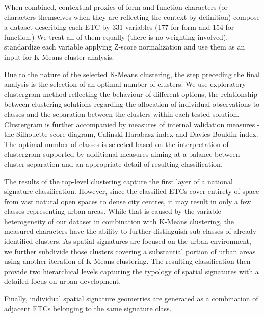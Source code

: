 

When combined, contextual proxies of form and function characters (or characters
themselves when they are reflecting the context by definition) compose a dataset
describing each ETC by 331 variables (177 for form and 154 for function.) We treat all
of them equally (there is no weighting involved), standardize each variable applying
Z-score normalization and use them as an input for K-Means cluster analysis.

Due to the nature of the selected K-Means clustering, the step preceding the final
analysis is the selection of an optimal number of clusters. We use exploratory
clustergram method\cite{schonlau2002clustergram} reflecting the behaviour of different options, the relationship
between clustering solutions regarding the allocation of individual observations to
classes and the separation between the clusters within each tested solution.
Clustergram is further accompanied by measures of internal validation measures - the
Silhouette score diagram, Calinski-Harabasz index\cite{calinski1974} and Davies-Bouldin index\cite{davies1979cluster}. The optimal
number of classes is selected based on the interpretation of clustergram supported by
additional measures aiming at a balance between cluster separation and an appropriate
detail of resulting classification.

The results of the top-level clustering capture the first layer of a national signature
classification. However, since the classified ETCs cover entirety of space from vast
natural open spaces to dense city centres, it may result in only a few classes
representing urban areas. While that is caused by the variable heterogeneity of our
dataset in combination with K-Means clustering, the measured characters have the ability
to further distinguish sub-classes of already identified clusters. As spatial signatures
are focused on the urban environment, we further subdivide those clusters covering
a substantial portion of urban areas using another iteration of K-Means clustering.
The resulting classification then provide two hierarchical levels capturing the typology of
spatial signatures with a detailed focus on urban development.


Finally, individual spatial signature geometries are generated as a combination of
adjacent ETCs belonging to the same signature class.

